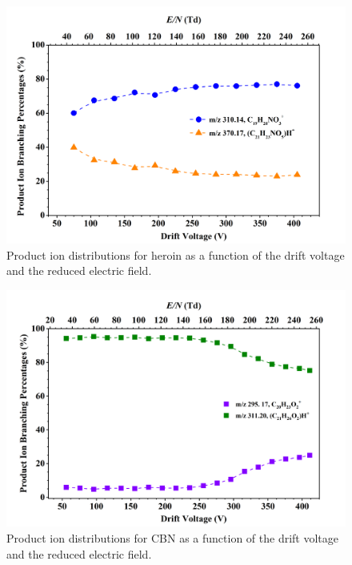 


\begin{figure}[htb]
\centering
\includegraphics[width=0.80\linewidth]{pics/other_drugs/heroinBRud.png}
\caption{Product ion distributions for heroin as a function of the drift voltage and the reduced electric field.}
\label{fig:DR_heroin}
\end{figure}





\begin{figure}[htb]
\centering
\includegraphics[width=0.80\linewidth]{pics/other_drugs/CBN-br.png}
\caption{Product ion distributions for CBN as a function of the drift voltage and the reduced electric field.}
\label{fig:DR_CBN}
\end{figure}

